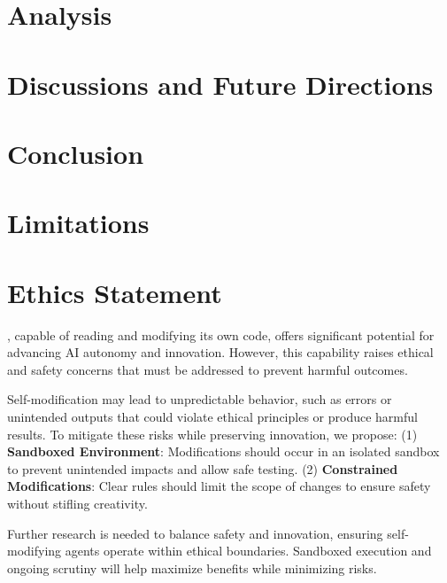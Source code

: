 \documentclass[11pt]{article}
\begin{document}
\section{Analysis}



\section{Discussions and Future Directions}



\section{Conclusion}


\section*{Limitations}


\section*{Ethics Statement}
\framework{}, capable of reading and modifying its own code, offers significant potential for advancing AI autonomy and innovation. However, this capability raises ethical and safety concerns that must be addressed to prevent harmful outcomes.

Self-modification may lead to unpredictable behavior, such as errors or unintended outputs that could violate ethical principles or produce harmful results. To mitigate these risks while preserving innovation, we propose:
(1) \textbf{Sandboxed Environment}: Modifications should occur in an isolated sandbox to prevent unintended impacts and allow safe testing.
(2) \textbf{Constrained Modifications}: Clear rules should limit the scope of changes to ensure safety without stifling creativity.

Further research is needed to balance safety and innovation, ensuring self-modifying agents operate within ethical boundaries. Sandboxed execution and ongoing scrutiny will help maximize benefits while minimizing risks.



% 
% 

\newpage
\appendix
\end{document}
